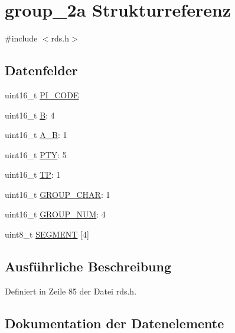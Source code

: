\hypertarget{structgroup__2a}{}\section{group\+\_\+2a Strukturreferenz}
\label{structgroup__2a}


{\ttfamily \#include $<$rds.\+h$>$}

\subsection*{Datenfelder}
\begin{DoxyCompactItemize}
\item 
uint16\+\_\+t \hyperlink{structgroup__2a_a5cd9b1f6413028425796c1129aa8fd87}{P\+I\+\_\+\+C\+O\+D\+E}
\item 
uint16\+\_\+t \hyperlink{structgroup__2a_ae783bd90764c8455228772c025c064e4}{B}\+: 4
\item 
uint16\+\_\+t \hyperlink{structgroup__2a_a226eb9a4ec1152d0c92ce7324916ad56}{A\+\_\+\+B}\+: 1
\item 
uint16\+\_\+t \hyperlink{structgroup__2a_a0474967478fbbc2c71b800d2e0132d45}{P\+T\+Y}\+: 5
\item 
uint16\+\_\+t \hyperlink{structgroup__2a_ab9e634c63b0d95a96716d5f6d7f06d72}{T\+P}\+: 1
\item 
uint16\+\_\+t \hyperlink{structgroup__2a_a66d4119990dc4c3e040a43885e9bb953}{G\+R\+O\+U\+P\+\_\+\+C\+H\+A\+R}\+: 1
\item 
uint16\+\_\+t \hyperlink{structgroup__2a_a9f692e9f76ee88348d426bcd4e9bc70b}{G\+R\+O\+U\+P\+\_\+\+N\+U\+M}\+: 4
\item 
uint8\+\_\+t \hyperlink{structgroup__2a_a51d200a5620dec8e6cd7a76c63d03ed1}{S\+E\+G\+M\+E\+N\+T} \mbox{[}4\mbox{]}
\end{DoxyCompactItemize}


\subsection{Ausführliche Beschreibung}


Definiert in Zeile 85 der Datei rds.\+h.



\subsection{Dokumentation der Datenelemente}
\hypertarget{structgroup__2a_a226eb9a4ec1152d0c92ce7324916ad56}{}
